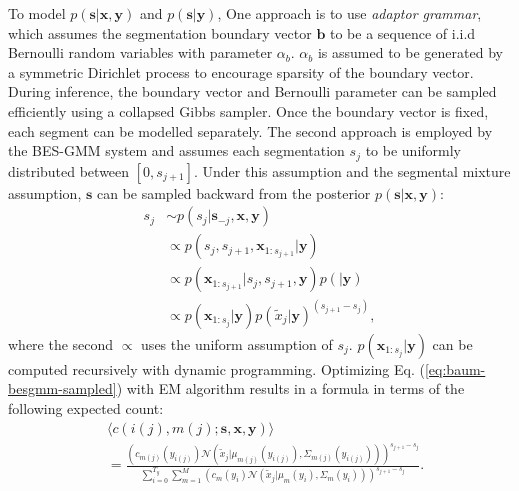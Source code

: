 \documentclass[journal]{IEEEtran}
\begin{document}
To model $p(\mathbf s|\mathbf x, \mathbf y)$ and $p(\mathbf s|\mathbf y)$, One approach 
 is to use \textit{adaptor grammar}\cite{Johnson2007, Lee2012}, which assumes the segmentation boundary vector $\mathbf{b}$ to be a sequence of i.i.d Bernoulli random variables with parameter $\alpha_b$. $\alpha_b$ is assumed to be generated by a symmetric Dirichlet process to encourage sparsity of the boundary vector. During inference, the boundary vector and Bernoulli parameter can be sampled efficiently using a collapsed Gibbs sampler. Once the boundary vector is fixed, each segment can be modelled separately. The second approach is employed by the BES-GMM system \cite{Kamper2017} and assumes each segmentation $s_j$ to be uniformly distributed between $[0, s_{j+1}]$. Under this assumption and the segmental mixture assumption, $\mathbf s$ can be sampled backward from the posterior $p(\mathbf s|\mathbf x, \mathbf y)$:
 \begin{align*}
     s_j &\sim p(s_j|\mathbf s_{-j}, \mathbf x, \mathbf y)\\
     &\propto p(s_j, s_{j+1}, \mathbf x_{1:s_{j+1}}|\mathbf y)\\
     &\propto p(\mathbf x_{1:s_{j+1}}|s_j, s_{j+1}, \mathbf y) p(|\mathbf y)\\
     &\propto p(\mathbf x_{1:s_{j}}|\mathbf y) p(\tilde{x}_j|\mathbf y)^{(s_{j+1}-s_j)},
 \end{align*}
 where the second $\propto$ uses the uniform assumption of $s_j$. $p(\mathbf x_{1:s_{j}}|\mathbf y)$ can be computed recursively with dynamic programming. Optimizing Eq. (\ref{eq:baum-besgmm-sampled}) with EM algorithm results in a formula in terms of the following expected count:
 \begin{align}\label{eq:expected_counts_besgmm}
     &\langle c(i(j), m(j);\mathbf s, \mathbf x, \mathbf y)\rangle\\
     &= \frac{(c_{m(j)}(y_{i(j)})\mathcal N(\tilde{x}_j|\mu_{m(j)}(y_{i(j)}), \Sigma_{m(j)}(y_{i(j)})))^{s_{j+1}-s_j}}{\sum_{i=0}^{T_y}\sum_{m=1}^M (c_{m}(y_{i})\mathcal N(\tilde{x}_j|\mu_{m}(y_{i}), \Sigma_{m}(y_{i})))^{s_{j+1}-s_j}}.
 \end{align}
 
\end{document}
